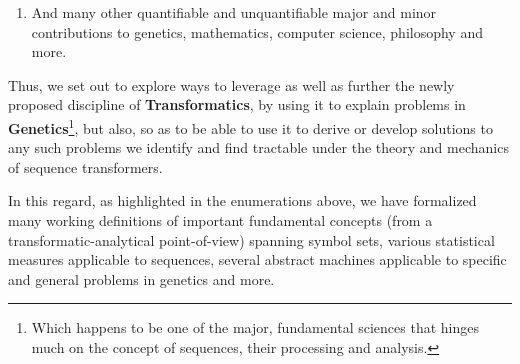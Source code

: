\documentclass[a4paper, 18pt]{book} %
\begin{document}
\begin{enumerate}
{\begin{enumerate}
\item \textbf{\hyperref[LST_FLSA]{Listing \ref{LST_FLSA}}} --- The First Lu-Shuffle Algorithm.
\item \textbf{\hyperref[LST_SLSA]{Listing \ref{LST_SLSA}}} --- The Second  Lu-Shuffle Algorithm.
\item \textbf{\hyperref[LST_USYMBOLSET]{Listing \ref{LST_USYMBOLSET}}} --- Generate Unspecific Symbol Set for Any Sequence.
\item \textbf{\hyperref[LST_PROTRACT]{Listing \ref{LST_PROTRACT}}} --- Multiply any Sequence by a given factor.
\item \textbf{\hyperref[LST_RNG]{Listing \ref{LST_RNG}}} --- Generate a Random Number within a specified range.
\item \textbf{\hyperref[LST_SHUFFLE]{Listing \ref{LST_SHUFFLE}}} --- Shuffle/Anagrammatize a sequence using no other parameters.
\item \textbf{\hyperref[LST_SELECT]{Listing \ref{LST_SELECT}}} --- Select a specific number of items from some sequence.
\item \textbf{\hyperref[LST_RSG]{Listing \ref{LST_RSG}}} --- Generate a random sequence of a specified length and whose terms derive from the symbol set of a specified input sequence.
\end{enumerate}

}
\item And many other quantifiable and unquantifiable major and minor contributions to genetics, mathematics, computer science, philosophy and more.
\end{enumerate}

\vspace{1em}

Thus, we set out to explore ways to leverage as well as further the newly proposed discipline of \textbf{Transformatics}, by using it to explain problems in \textbf{Genetics}\footnote{Which happens to be one of the major, fundamental sciences that hinges much on the concept of sequences, their processing and analysis.}, but also, so as to be able to use it to derive or develop solutions to any such problems we identify and find tractable under the theory and mechanics of sequence transformers. 

In this regard, as highlighted in the enumerations above, we have formalized many working definitions of important fundamental concepts (from a transformatic-analytical point-of-view) spanning symbol sets, various statistical measures applicable to sequences, several abstract machines applicable to specific and general problems in genetics and more. 
\end{document}

